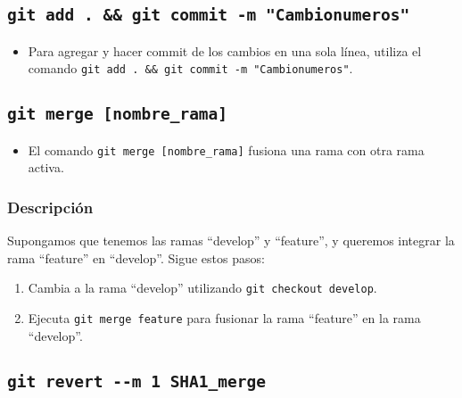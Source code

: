 \documentclass[
  a4paper,
]{article}
\providecommand{\tightlist}{%
  \setlength{\itemsep}{0pt}\setlength{\parskip}{0pt}}\usepackage{longtable,booktabs,array}
\begin{document}
\subsection{\texorpdfstring{\texttt{git\ add\ .\ \&\&\ git\ commit\ -m\ "Cambionumeros"}}{git add . \&\& git commit -m "Cambionumeros"}}\label{git-add-.-git-commit--m-cambionumeros}

\begin{itemize}
\tightlist
\item
  Para agregar y hacer commit de los cambios en una sola línea, utiliza
  el comando
  \texttt{git\ add\ .\ \&\&\ git\ commit\ -m\ "Cambionumeros"}.
\end{itemize}

\subsection{\texorpdfstring{\texttt{git\ merge\ {[}nombre\_rama{]}}}{git merge {[}nombre\_rama{]}}}\label{git-merge-nombre_rama}

\begin{itemize}
\tightlist
\item
  El comando \texttt{git\ merge\ {[}nombre\_rama{]}} fusiona una rama
  con otra rama activa.
\end{itemize}

\subsubsection{Descripción}\label{descripciuxf3n}

Supongamos que tenemos las ramas ``develop'' y ``feature'', y queremos
integrar la rama ``feature'' en ``develop''. Sigue estos pasos:

\begin{enumerate}
\def\labelenumi{\arabic{enumi}.}
\tightlist
\item
  Cambia a la rama ``develop'' utilizando
  \texttt{git\ checkout\ develop}.
\item
  Ejecuta \texttt{git\ merge\ feature} para fusionar la rama ``feature''
  en la rama ``develop''.
\end{enumerate}

\subsection{\texorpdfstring{\texttt{git\ revert\ -\/-m\ 1\ SHA1\_merge}}{git revert -\/-m 1 SHA1\_merge}}\label{git-revert---m-1-sha1_merge}
\end{document}
